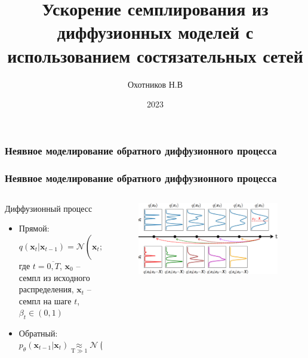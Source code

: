 \documentclass[8pt]{beamer}
\title[]{Ускорение семплирования из диффузионных моделей с использованием состязательных сетей}
\author{Охотников Н.В}
\institute{МФТИ}
\date{2023}
\begin{document}
\begin{frame}
  \titlepage
\end{frame}


\begin{frame}
	\frametitle{Неявное моделирование обратного диффузионного процесса}



\end{frame}




	\setlength{\footskip}{1.8cm}
\begin{frame}
	\frametitle{Неявное моделирование обратного диффузионного процесса}


	\begin{columns}
		\begin{column}{0.5\textwidth}
			\begin{block}{Диффузионный процесс}
				\begin{itemize}
				
					\item Прямой: 
					\begin{equation*}
					q(\textbf{x}_t|\textbf{x}_{t-1}) = \mathcal{N}(\textbf{x}_t; \textbf{x}_{t-1}\sqrt{1-\beta_t}, \beta_t 	\textbf{I})
					\end{equation*}
					где $t = \overline{0,T}$, $\textbf{x}_0$ -- семпл из исходного распределения, $\textbf{x}_t$ -- семпл на шаге $t$, $\beta_t\in (0,1)$\\
					
					\item Обратный: 
					\begin{equation*}
					p_\theta(\textbf{x}_{t-1}|\textbf{x}_t)\!\! \underset{\text{T} \gg 1}{ \approx}\!\!\! \mathcal{N}(\textbf{x}_{t-1};\mu_\theta(\textbf{x}_t,t), \Sigma_\theta(\textbf{x}_t, t))
					\end{equation*}
			
				\end{itemize}
			\end{block}		
		\end{column}
		
		\begin{column}{0.55\textwidth} 
			
				\begin{figure}[h!]
						\begin{flushright}
							\includegraphics[width=0.97\textwidth]{figures/distributions.png}
						\end{flushright}		
				\end{figure}
	

\end{column}
\end{columns}
\end{frame}
\end{document}
